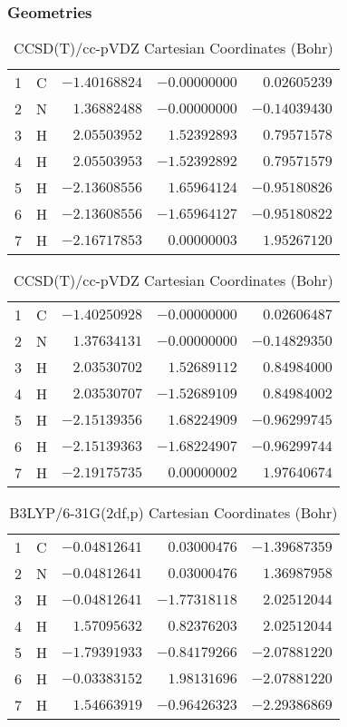 \documentclass[10pt,oneside]{article}
\begin{document}
\begin{table}[h!]
\subsubsection*{Geometries}
\begin{multicols}{2}
\centering
\caption{CCSD(T)/cc-pVTZ Cartesian Coordinates (Bohr)}
\begin{tabular}{llrrr}
\toprule
1  & C  & $-1.40168824$ & $-0.00000000$ & $ 0.02605239$ \\
2  & N  & $ 1.36882488$ & $-0.00000000$ & $-0.14039430$ \\
3  & H  & $ 2.05503952$ & $ 1.52392893$ & $ 0.79571578$ \\
4  & H  & $ 2.05503953$ & $-1.52392892$ & $ 0.79571579$ \\
5  & H  & $-2.13608556$ & $ 1.65964124$ & $-0.95180826$ \\
6  & H  & $-2.13608556$ & $-1.65964127$ & $-0.95180822$ \\
7  & H  & $-2.16717853$ & $ 0.00000003$ & $ 1.95267120$ \\
\bottomrule
\end{tabular}
\caption{CCSD(T)/cc-pVDZ Cartesian Coordinates (Bohr)}
\begin{tabular}{llrrr}
\toprule
1  & C  & $-1.40250928$ & $-0.00000000$ & $ 0.02606487$ \\
2  & N  & $ 1.37634131$ & $-0.00000000$ & $-0.14829350$ \\
3  & H  & $ 2.03530702$ & $ 1.52689112$ & $ 0.84984000$ \\
4  & H  & $ 2.03530707$ & $-1.52689109$ & $ 0.84984002$ \\
5  & H  & $-2.15139356$ & $ 1.68224909$ & $-0.96299745$ \\
6  & H  & $-2.15139363$ & $-1.68224907$ & $-0.96299744$ \\
7  & H  & $-2.19175735$ & $ 0.00000002$ & $ 1.97640674$ \\
\bottomrule
\end{tabular}
\end{multicols}
\end{table}

\begin{table}[h]
\centering
\caption{B3LYP/6-31G(2df,p) Cartesian Coordinates (Bohr)}
\begin{tabular}{llrrr}
\toprule
1  & C  & $-0.04812641$ & $ 0.03000476$ & $-1.39687359$ \\
2  & N  & $-0.04812641$ & $ 0.03000476$ & $ 1.36987958$ \\
3  & H  & $-0.04812641$ & $-1.77318118$ & $ 2.02512044$ \\
4  & H  & $ 1.57095632$ & $ 0.82376203$ & $ 2.02512044$ \\
5  & H  & $-1.79391933$ & $-0.84179266$ & $-2.07881220$ \\
6  & H  & $-0.03383152$ & $ 1.98131696$ & $-2.07881220$ \\
7  & H  & $ 1.54663919$ & $-0.96426323$ & $-2.29386869$ \\
\bottomrule
\end{tabular}
\end{table}
\end{document}
